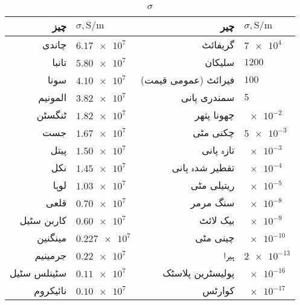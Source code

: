 {\renewcommand{\arraystretch}{1.2}
\begin{table}
\caption{$\sigma$}
\centering
\begin{tabular}{r | l || r | l}
\hline 
چیز & $\sigma, \si{\siemens \per \meter}$ & چیر & $\sigma, \si{\siemens \per \meter}$\\
\hline
چاندی &$\num{6.17e7}$ &گریفائٹ & $\num{7e4}$\\
تانبا & $\num{5.80e7}$&سلیکان & $\num{1200}$\\
سونا & $\num{4.10e7}$&فیرائٹ (عمومی قیمت) &$\num{100}$ \\
المونیم &$\num{3.82e7}$ &سمندری پانی &$\num{5}$ \\
ٹنگسٹن &$\num{1.82e7}$ &چھونا پتھر &$\num{e-2}$ \\
جست & $\num{1.67e7}$& چکنی مٹی&$\num{5e-3}$ \\
پیتل &$\num{1.50e7}$ & تازہ پانی&$\num{e-3}$ \\
نکل &$\num{1.45e7}$ & تقطیر شدہ پانی& $\num{e-4}$\\
لوہا &$\num{1.03e7}$ & ریتیلی مٹی & $\num{e-5}$\\
قلعی &$\num{0.70e7}$ &سنگ مرمر &$\num{e-8}$ \\
کاربن سٹیل & $\num{0.60e7}$& بیک لائٹ & $\num{e-9}$\\
مینگنین & $\num{0.227e7}$ & چینی مٹی &$\num{e-10}$ \\
جرمینیم & $\num{0.22e7}$& ہیرا&$\num{2e-13}$ \\
سٹینلس سٹیل &$\num{0.11e7}$ &پولیسٹرین پلاسٹک &$\num{e-16}$ \\
نائیکروم & $\num{0.10e7}$&کوارٹس &$\num{e-17}$ \\
\end{tabular}
\label{جدول_جدول_موصلیت_کے_مستقل}
\end{table}
}
